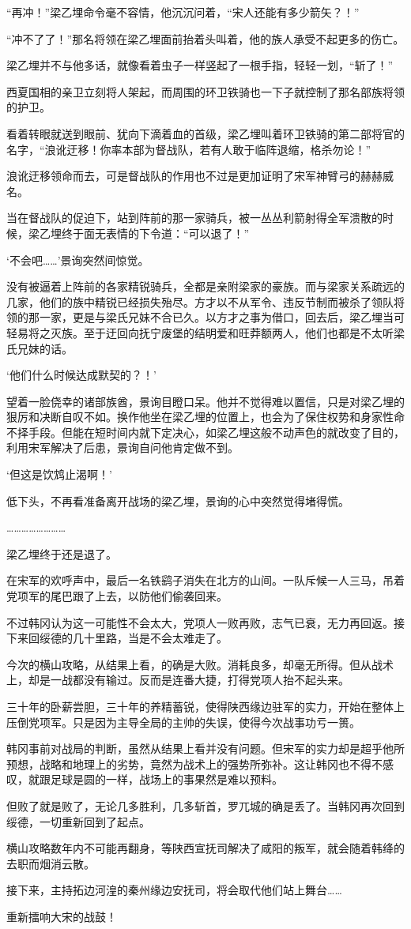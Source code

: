 “再冲！”梁乙埋命令毫不容情，他沉沉问着，“宋人还能有多少箭矢？！”

“冲不了了！”那名将领在梁乙埋面前抬着头叫着，他的族人承受不起更多的伤亡。

梁乙埋并不与他多话，就像看着虫子一样竖起了一根手指，轻轻一划，“斩了！”

西夏国相的亲卫立刻将人架起，而周围的环卫铁骑也一下子就控制了那名部族将领的护卫。

看着转眼就送到眼前、犹向下滴着血的首级，梁乙埋叫着环卫铁骑的第二部将官的名字，“浪讹迂移！你率本部为督战队，若有人敢于临阵退缩，格杀勿论！”

浪讹迂移领命而去，可是督战队的作用也不过是更加证明了宋军神臂弓的赫赫威名。

当在督战队的促迫下，站到阵前的那一家骑兵，被一丛丛利箭射得全军溃散的时候，梁乙埋终于面无表情的下令道：“可以退了！”

‘不会吧……’景询突然间惊觉。

没有被逼着上阵前的各家精锐骑兵，全都是亲附梁家的豪族。而与梁家关系疏远的几家，他们的族中精锐已经损失殆尽。方才以不从军令、违反节制而被杀了领队将领的那一家，更是与梁氏兄妹不合已久。以方才之事为借口，回去后，梁乙埋当可轻易将之灭族。至于迂回向抚宁废堡的结明爱和旺莽额两人，他们也都是不太听梁氏兄妹的话。

‘他们什么时候达成默契的？！’

望着一脸侥幸的诸部族酋，景询目瞪口呆。他并不觉得难以置信，只是对梁乙埋的狠厉和决断自叹不如。换作他坐在梁乙埋的位置上，也会为了保住权势和身家性命不择手段。但能在短时间内就下定决心，如梁乙埋这般不动声色的就改变了目的，利用宋军解决了后患，景询自问他肯定做不到。

‘但这是饮鸩止渴啊！’

低下头，不再看准备离开战场的梁乙埋，景询的心中突然觉得堵得慌。

……………………

梁乙埋终于还是退了。

在宋军的欢呼声中，最后一名铁鹞子消失在北方的山间。一队斥候一人三马，吊着党项军的尾巴跟了上去，以防他们偷袭回来。

不过韩冈认为这一可能性不会太大，党项人一败再败，志气已衰，无力再回返。接下来回绥德的几十里路，当是不会太难走了。

今次的横山攻略，从结果上看，的确是大败。消耗良多，却毫无所得。但从战术上，却是一战都没有输过。反而是连番大捷，打得党项人抬不起头来。

三十年的卧薪尝胆，三十年的养精蓄锐，使得陕西缘边驻军的实力，开始在整体上压倒党项军。只是因为主导全局的主帅的失误，使得今次战事功亏一篑。

韩冈事前对战局的判断，虽然从结果上看并没有问题。但宋军的实力却是超乎他所预想，战略和地理上的劣势，竟然为战术上的强势所弥补。这让韩冈也不得不感叹，就跟足球是圆的一样，战场上的事果然是难以预料。

但败了就是败了，无论几多胜利，几多斩首，罗兀城的确是丢了。当韩冈再次回到绥德，一切重新回到了起点。

横山攻略数年内不可能再翻身，等陕西宣抚司解决了咸阳的叛军，就会随着韩绛的去职而烟消云散。

接下来，主持拓边河湟的秦州缘边安抚司，将会取代他们站上舞台……

重新擂响大宋的战鼓！

